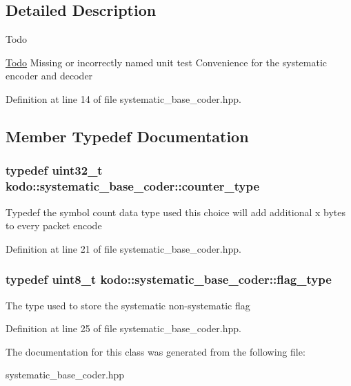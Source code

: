 \subsection{Detailed Description}
\begin{DoxyRefDesc}{Todo}
\item[\hyperlink{todo__todo000064}{Todo}]Missing or incorrectly named unit test Convenience for the systematic encoder and decoder \end{DoxyRefDesc}


Definition at line 14 of file systematic\-\_\-base\-\_\-coder.\-hpp.



\subsection{Member Typedef Documentation}
\hypertarget{classkodo_1_1systematic__base__coder_ae380cbb615817050943c82186714025c}{
\subsubsection[{counter\-\_\-type}]{\setlength{\rightskip}{0pt plus 5cm}typedef uint32\-\_\-t {\bf kodo\-::systematic\-\_\-base\-\_\-coder\-::counter\-\_\-type}}}\label{classkodo_1_1systematic__base__coder_ae380cbb615817050943c82186714025c}
Typedef the symbol count data type used this choice will add additional x bytes to every packet encode 

Definition at line 21 of file systematic\-\_\-base\-\_\-coder.\-hpp.

\hypertarget{classkodo_1_1systematic__base__coder_a5bf58be17746f35c5533306610a20181}{
\subsubsection[{flag\-\_\-type}]{\setlength{\rightskip}{0pt plus 5cm}typedef uint8\-\_\-t {\bf kodo\-::systematic\-\_\-base\-\_\-coder\-::flag\-\_\-type}}}\label{classkodo_1_1systematic__base__coder_a5bf58be17746f35c5533306610a20181}
The type used to store the systematic non-\/systematic flag 

Definition at line 25 of file systematic\-\_\-base\-\_\-coder.\-hpp.



The documentation for this class was generated from the following file\-:\begin{DoxyCompactItemize}
\item 
systematic\-\_\-base\-\_\-coder.\-hpp\end{DoxyCompactItemize}

